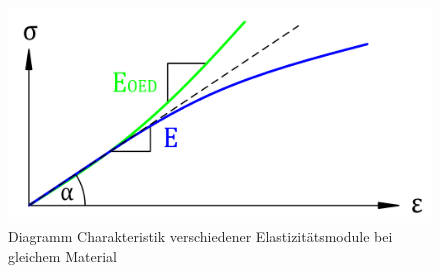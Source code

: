\begin{figure}
	\centering
	\includegraphics[width=0.5\linewidth,keepaspectratio]{papers/spannung/Grafiken/DiagrammOedometer-Versuch.png}
	\caption{Diagramm Charakteristik verschiedener Elastizitätsmodule bei gleichem Material}
	\label{fig:DiagrammOedometer-Versuch}
\end{figure}
